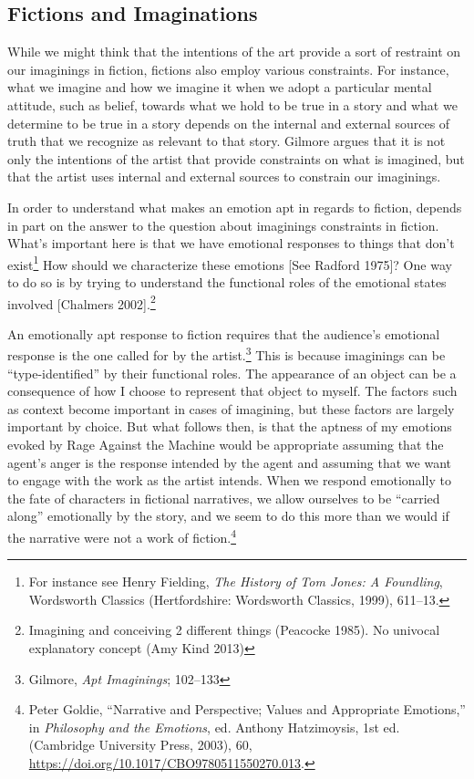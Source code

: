 \documentclass[phdthesis,12pt,final,a4paper]{wuthesis}
\theoremstyle{definition}
\theoremstyle{definition}
\theoremstyle{definition}
\theoremstyle{definition}
\theoremstyle{remark}
\begin{document}
\subsection*{Fictions and Imaginations}\label{fictions-and-imaginations}

While we might think that the intentions of the art provide a sort of restraint on our imaginings in fiction, fictions also employ various constraints. For instance, what we imagine and how we imagine it when we adopt a particular mental attitude, such as belief, towards what we hold to be true in a story and what we determine to be true in a story depends on the internal and external sources of truth that we recognize as relevant to that story. Gilmore argues that it is not only the intentions of the artist that provide constraints on what is imagined, but that the artist uses internal and external sources to constrain our imaginings.

In order to understand what makes an emotion apt in regards to fiction, depends in part on the answer to the question about imaginings constraints in fiction. What's important here is that we have emotional responses to things that don't exist\footnote{For instance see Henry Fielding, \emph{The {History} of {Tom Jones}: {A} Foundling}, Wordsworth {Classics} (Hertfordshire: Wordsworth Classics, 1999), 611--13.} How should we characterize these emotions {[}See Radford 1975{]}? One way to do so is by trying to understand the functional roles of the emotional states involved {[}Chalmers 2002{]}.\footnote{Imagining and conceiving 2 different things (Peacocke 1985). No univocal explanatory concept (Amy Kind 2013)}

An emotionally apt response to fiction requires that the audience's emotional response is the one called for by the artist.\footnote{Gilmore, \emph{Apt {Imaginings}}; 102--133} This is because imaginings can be ``type-identified'' by their functional roles. The appearance of an object can be a consequence of how I choose to represent that object to myself. The factors such as context become important in cases of imagining, but these factors are largely important by choice. But what follows then, is that the aptness of my emotions evoked by Rage Against the Machine would be appropriate assuming that the agent's anger is the response intended by the agent and assuming that we want to engage with the work as the artist intends. When we respond emotionally to the fate of characters in fictional narratives, we allow ourselves to be ``carried along'' emotionally by the story, and we seem to do this more than we would if the narrative were not a work of fiction.\footnote{Peter Goldie, {``Narrative and {Perspective}; {Values} and {Appropriate Emotions},''} in \emph{Philosophy and the {Emotions}}, ed. Anthony Hatzimoysis, 1st ed. (Cambridge University Press, 2003), 60, \url{https://doi.org/10.1017/CBO9780511550270.013}.}
\end{document}
